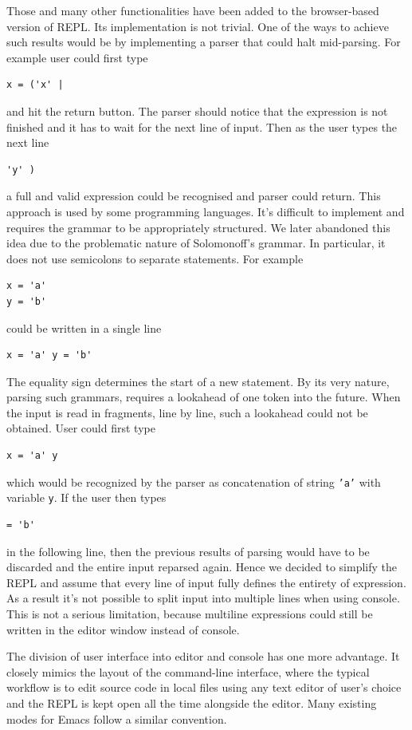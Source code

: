 Those and many other functionalities have been added to the browser-based version of REPL. Its implementation is not trivial. One of the ways to achieve such results would be by implementing a parser that could halt mid-parsing. For example user could first type
\begin{lstlisting}
x = ('x' |
\end{lstlisting}
and hit the return button. The parser should notice that the expression is not finished and it has to wait for the next line of input.  Then as the user types the next line
\begin{lstlisting}
'y' )
\end{lstlisting}
a full and valid expression could be recognised and parser could return.
This approach is used by some programming languages. It's difficult to implement and requires the grammar to be appropriately structured. We later abandoned this idea due to the problematic nature of Solomonoff's grammar. In particular, it does not use semicolons to separate statements. For example
\begin{lstlisting}
x = 'a' 
y = 'b'
\end{lstlisting}
could be written in a single line
\begin{lstlisting}
x = 'a' y = 'b'
\end{lstlisting}
The equality sign determines the start of a new statement. By its very nature, parsing such grammars, requires a lookahead of one token into the future. When the input is read in fragments, line by line, such a lookahead could not be obtained.
User could first type
\begin{lstlisting}
x = 'a' y
\end{lstlisting}
which would be recognized by the parser as concatenation of string    \texttt{'a'} with variable  \texttt{y}. If the user then types
\begin{lstlisting}
= 'b'
\end{lstlisting}
in the following line, then the previous results of parsing would have to be discarded and the entire input reparsed again. Hence we decided to simplify the REPL and assume that every line of input fully defines the entirety of expression. As a result it's not possible to split input into multiple lines when using console. This is not a serious limitation, because multiline expressions could still be written in the editor window instead of console. 

The division of user interface into editor and console has one more advantage. It closely mimics the layout of the command-line interface, where the typical workflow is to edit source code in local files using any text editor of user's choice and the REPL is kept open all the time alongside the editor. Many existing modes for Emacs follow a similar convention.

